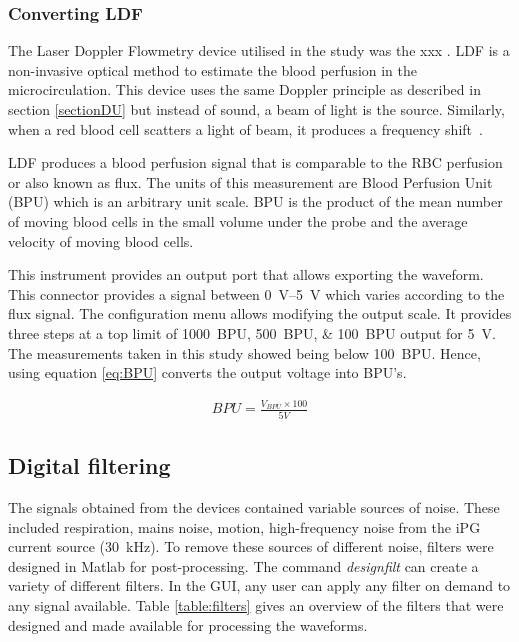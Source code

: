 \subsubsection{Converting LDF}
\label{section:ldf}
The Laser Doppler Flowmetry device utilised in the study was the xxx . LDF is a non-invasive optical method to estimate the blood perfusion in the microcirculation. This device uses the same Doppler principle as described in section \ref{sectionDU} but instead of sound, a beam of light is the source. Similarly, when a red blood cell scatters a light of beam, it produces a frequency shift~\cite{fredriksson2007laser}. 

LDF produces a blood perfusion signal that is comparable to the RBC perfusion or also known as flux. The units of this measurement are Blood Perfusion Unit (BPU) which is an arbitrary unit scale. BPU is the product of the mean number of moving blood cells in the small volume under the probe and the average velocity of moving blood cells. 

This instrument provides an output port that allows exporting the waveform. This connector provides a signal between \SIrange{0}{5}{\volt} which varies according to the flux signal. The configuration menu allows modifying the output scale. It provides three steps at a top limit of \SIlist{1000;500;100}{BPU} output for \SI{5}{\volt}. The measurements taken in this study showed being below \SI{100}{BPU}. Hence, using equation \ref{eq:BPU} converts the output voltage into BPU's.

\begin{align}
	\label{eq:BPU}
	BPU = \frac{V_{BPU} \times 100}{5 V}
\end{align}


\subsection{Digital filtering}
\label{section procedure 2.2}

The signals obtained from the devices contained variable sources of noise. These included respiration, mains noise, motion, high-frequency noise from the iPG current source (\SI{30}{\kilo\hertz}). To remove these sources of different noise, filters were designed in Matlab for post-processing. The command \textit{designfilt} can create a variety of different filters. In the GUI, any user can apply any filter on demand to any signal available. Table \ref{table:filters} gives an overview of the filters that were designed and made available for processing the waveforms. 

